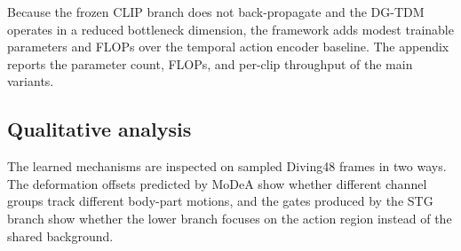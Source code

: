 Because the frozen CLIP branch does not back-propagate and the DG-TDM operates
in a reduced bottleneck dimension, the framework adds modest trainable
parameters and FLOPs over the temporal action encoder baseline. The appendix
reports the parameter count, FLOPs, and per-clip throughput of the main
variants.

\subsection{Qualitative analysis}
\label{sec:qual}

The learned mechanisms are inspected on sampled Diving48 frames in two ways.
The deformation offsets predicted by MoDeA show whether different channel
groups track different body-part motions, and the gates produced by the STG
branch show whether the lower branch focuses on the action region instead of
the shared background.
